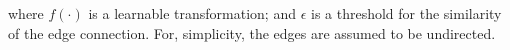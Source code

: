\documentclass[letterpaper]{article} %
\def\vs{{\bm{s}}}
\def\vx{{\bm{x}}}
\begin{document}
where $f(\cdot)$ is a learnable transformation; and $\epsilon$ is a threshold for the similarity of the edge connection. For, simplicity, the edges are assumed to be undirected.






\end{document}
